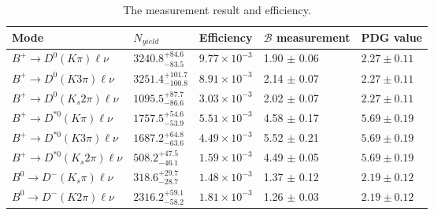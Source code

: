 \begin{table}[h]
\small
\begin{center}
\begin{tabular}{ |p{3.7cm}||p{2cm}||p{2cm}||p{2.4cm}||p{2.4cm}| }
\hline
 Mode & $N_{yield}$ & Efficiency & $\mathcal{B}$ measurement & PDG value  \\
 \hline
 $ B^+ \rightarrow D^0(K\pi) \ell \nu$ & $3240.8^{+84.6}_{-83.5}$  & $9.77 \times 10^{-3}$ &1.90 $\pm$ 0.06 & $2.27 \pm 0.11$ \\ 
  \hline
 $ B^+ \rightarrow D^0(K 3 \pi) \ell \nu$ & $3251.4^{+101.7}_{-100.8}$ & $8.91 \times 10^{-3}$ &2.14 $\pm$ 0.07 & $2.27 \pm 0.11$ \\ 
  \hline
 $ B^+ \rightarrow D^0(K_s 2 \pi) \ell \nu$ &$1095.5^{+87.7}_{-86.6}$ & $3.03 \times 10^{-3}$ &2.02 $\pm$ 0.07 & $2.27 \pm 0.11$ \\ 
  \hline
 $ B^+ \rightarrow D^{*0}(K\pi) \ell \nu$ &$1757.5^{+54.6}_{-53.9}$ & $5.51 \times 10^{-3}$&4.58 $\pm$ 0.17 & $5.69 \pm 0.19$ \\ 
  \hline
 $ B^+ \rightarrow D^{*0}(K 3 \pi) \ell \nu$ &$1687.2^{+64.8}_{-63.6}$ & $4.49 \times 10^{-3}$ &5.52 $\pm$ 0.21 & $5.69 \pm 0.19$ \\ 
  \hline
 $ B^+ \rightarrow D^{*0}(K_s 2 \pi) \ell \nu$ &$508.2^{+47.5}_{-46.1}$ & $1.59 \times 10^{-3}$ &4.49 $\pm$ 0.05 & $5.69 \pm 0.19$ \\ 
  \hline
 $ B^0 \rightarrow D^-(K_s\pi) \ell \nu$ &$318.6^{+29.7}_{-28.7}$ & $1.48 \times 10^{-3}$ &1.37 $\pm$ 0.12 & $2.19 \pm 0.12$ \\ 
  \hline
 $ B^0 \rightarrow D^-(K 2 \pi) \ell \nu$ &$2316.2^{+59.1}_{-58.2}$ & $1.81 \times 10^{-3}$ &1.26 $\pm$ 0.03 & $2.19 \pm 0.12$ \\ 
 \hline
 \hline
\end{tabular}
\caption{The measurement result and efficiency.} \label{t:brbeforec}
\end{center}
\end{table}
